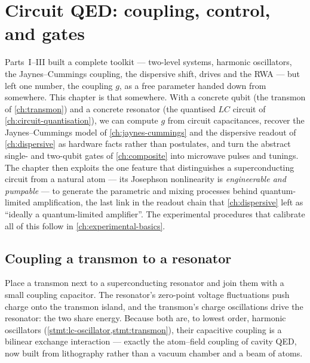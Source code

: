 \chapter{Circuit QED: coupling, control, and gates}
\label{ch:circuit-qed}

Parts~I--III built a complete toolkit --- two-level systems, harmonic
oscillators, the Jaynes--Cummings coupling, the dispersive shift, drives
and the RWA --- but left one number, the coupling $g$, as a free
parameter handed down from somewhere. This chapter is that somewhere.
With a concrete qubit (the transmon of \cref{ch:transmon}) and a
concrete resonator (the quantised $LC$ circuit of
\cref{ch:circuit-quantisation}), we can compute $g$ from circuit
capacitances, recover the Jaynes--Cummings model of
\cref{ch:jaynes-cummings} and the dispersive readout of
\cref{ch:dispersive} as hardware facts rather than postulates, and
turn the abstract single- and two-qubit gates of \cref{ch:composite}
into microwave pulses and tunings. The chapter then exploits the one
feature that distinguishes a superconducting circuit from a natural
atom --- its Josephson nonlinearity is \emph{engineerable and
pumpable} --- to generate the parametric and mixing processes behind
quantum-limited amplification, the last link in the readout chain that
\cref{ch:dispersive} left as ``ideally a quantum-limited amplifier''.
The experimental procedures that calibrate all of this follow in
\cref{ch:experimental-basics}.

\section{Coupling a transmon to a resonator}
\label{sec:cqed-coupling}

\begin{phenomenon}
Place a transmon next to a superconducting resonator and join them with
a small coupling capacitor. The resonator's zero-point voltage
fluctuations push charge onto the transmon island, and the transmon's
charge oscillations drive the resonator: the two share energy. Because
both are, to lowest order, harmonic oscillators
(\cref{stmt:lc-oscillator,stmt:transmon}), their capacitive coupling is
a bilinear exchange interaction --- exactly the atom--field coupling of
cavity QED, now built from lithography rather than a vacuum chamber and
a beam of atoms.
\end{phenomenon}


